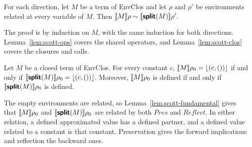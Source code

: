 \begin{lemma}\label{lem:scott-fundamental}
For each direction, let $M$ be a term of EnvClos and let $\rho$ and
$\rho'$ be environments related at every variable of $M$. Then
$\llbracket M \rrbracket\rho \sim \llbracket \textsf{\bfseries split}(M) \rrbracket\rho'$.
\end{lemma}

The proof is by induction on $M$, with the same induction for both
directions. Lemma~\ref{lem:scott-ops} covers the shared operators, and
Lemma~\ref{lem:scott-clos} covers the closures and calls.

\begin{lemma}\label{lem:scott-delay}
Let $M$ be a closed term of EnvClos. For every constant $c$,
$\llbracket M \rrbracket\rho_0 = \lfloor (c, ()) \rfloor$ if and only if
$\llbracket \textsf{\bfseries split}(M) \rrbracket\rho_0 = \lfloor (c, ()) \rfloor$. Moreover,
$\llbracket M \rrbracket\rho_0$ is defined if and only if
$\llbracket \textsf{\bfseries split}(M) \rrbracket\rho_0$ is defined.
\end{lemma}

The empty environments are related, so Lemma~\ref{lem:scott-fundamental}
gives that $\llbracket M \rrbracket\rho_0$ and $\llbracket \textsf{\bfseries split}(M) \rrbracket\rho_0$ are
related by both $\mathit{Pres}$ and $\mathit{Reflect}$. In either
relation, a defined approximated value has a defined partner, and a
defined value related to a constant is that constant. Preservation
gives the forward implications and reflection the backward ones.

